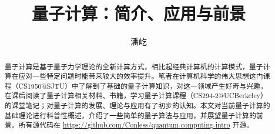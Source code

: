 \documentclass[a4paper, 12pt]{ctexart}
\begin{document}
\title{量子计算：简介、应用与前景}
\author{潘屹}
\date{}

\maketitle

\begin{abstract}
量子计算是基于量子力学理论的全新计算方式，相比起经典计算机的计算模式，量子计算在应对一些特定问题时能带来较大的效率提升。笔者在计算机科学的伟大思想这门课程（CS1950@SJTU）中了解到了基础的量子计算知识，对这一领域产生好奇与兴趣，在课后阅读了量子计算相关材料、书籍，学习量子计算课程（CS294-2@UCBerkeley）的课堂笔记；对量子计算的发展、理论与应用有了初步的认知。本文对当前量子计算的基础理论进行科普性概述，介绍了一些简单的量子算法与应用，并展望量子计算的前景。所有源代码在 \href{https://github.com/Conless/quantum-computing-intro}{https://github.com/Conless/quantum-computing-intro} 开源。
\end{abstract}

\tableofcontents








\end{document}
